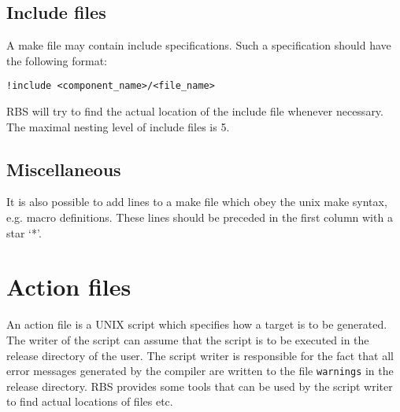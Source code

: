 \subsection{Include files}

A make file may contain include specifications. Such a specification should
have the following format:
\begin{verbatim}
!include <component_name>/<file_name>
\end{verbatim}
RBS will try to find the actual location of the include file whenever
necessary. The maximal nesting level of include files is 5.

\subsection{Miscellaneous}

It is also possible to add lines to a make file which obey the unix make
syntax, e.g. macro definitions. These lines should be preceded in the first
column with a star `*'.

\section{Action files}


An action file is a UNIX script which specifies how a target is to be generated.
The writer of the script can assume that the script is to be executed
in the release directory of the user. The script writer is responsible for the
fact that all error messages generated by the compiler are written to
the file \verb+warnings+ in the release directory. RBS provides some tools that
can be used by the script writer to find actual locations of files etc.

